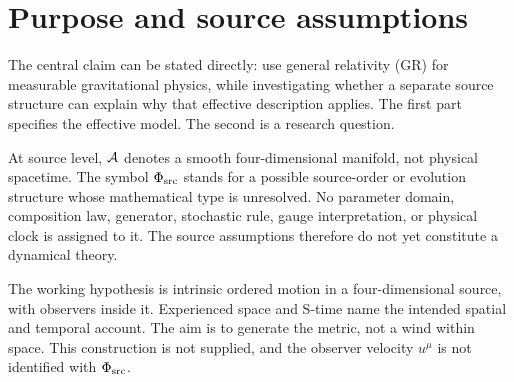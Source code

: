\documentclass[11pt]{article}
\begin{document}

\section{Purpose and source assumptions}
The central claim can be stated directly: use general relativity (GR) for measurable gravitational physics, while investigating whether a separate source structure can explain why that effective description applies. The first part specifies the effective model. The second is a research question.

At source level, $\mathcal A$ denotes a smooth four-dimensional manifold, not physical spacetime. The symbol $\Phi_{\mathrm{src}}$ stands for a possible source-order or evolution structure whose mathematical type is unresolved. No parameter domain, composition law, generator, stochastic rule, gauge interpretation, or physical clock is assigned to it. The source assumptions therefore do not yet constitute a dynamical theory.

The working hypothesis is intrinsic ordered motion in a four-dimensional source, with observers inside it. Experienced space and S-time name the intended spatial and temporal account. The aim is to generate the metric, not a wind within space. This construction is not supplied, and the observer velocity $u^\mu$ is not identified with $\Phi_{\mathrm{src}}$.
\end{document}
